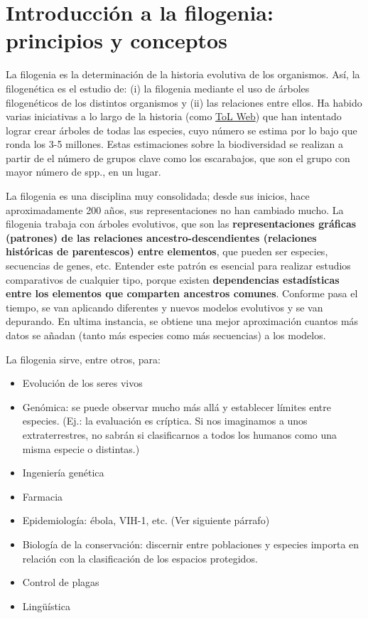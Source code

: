 \chapter{Introducción a la filogenia: principios y conceptos}
La filogenia es la determinación de la historia evolutiva de los organismos. Así, la filogenética es el estudio de: (i) la filogenia mediante el uso de árboles filogenéticos de los distintos organismos y (ii) las relaciones entre ellos. Ha habido varias iniciativas a lo largo de la historia (como \href{http://tolweb.org}{ToL Web}) que han intentado lograr crear árboles de todas las especies, cuyo número se estima por lo bajo que ronda los 3-5 millones. Estas estimaciones sobre la biodiversidad se realizan a partir de el número de grupos clave como los escarabajos, que son el grupo con mayor número de spp., en un lugar.

La filogenia es una disciplina muy consolidada; desde sus inicios, hace aproximadamente 200 años, sus representaciones no han cambiado mucho. La filogenia trabaja con árboles evolutivos, que son las \textbf{representaciones gráficas (patrones) de las relaciones ancestro-descendientes (relaciones históricas de parentescos) entre elementos}, que pueden ser especies, secuencias de genes, etc. Entender este patrón es esencial para realizar estudios comparativos de cualquier tipo, porque existen\textbf{ dependencias estadísticas entre los elementos que comparten ancestros comunes}. Conforme pasa el tiempo, se van aplicando diferentes y nuevos modelos evolutivos y se van depurando. En ultima instancia, se obtiene una mejor aproximación cuantos más datos se añadan (tanto más especies como más secuencias) a los modelos.

La filogenia sirve, entre otros, para: 
\begin{itemize}
\item Evolución de los seres vivos
\item Genómica: se puede observar mucho más allá y establecer límites entre especies. (Ej.: la evaluación es críptica. Si nos imaginamos a unos extraterrestres, no sabrán si clasificarnos a todos los humanos como una misma especie o distintas.)
\item Ingeniería genética
\item Farmacia
\item Epidemiología: ébola, VIH-1, etc. (Ver siguiente párrafo)
\item Biología de la conservación: discernir entre poblaciones y especies importa en relación con la clasificación de los espacios protegidos.
\item Control de plagas
\item Lingüística
\end{itemize}

